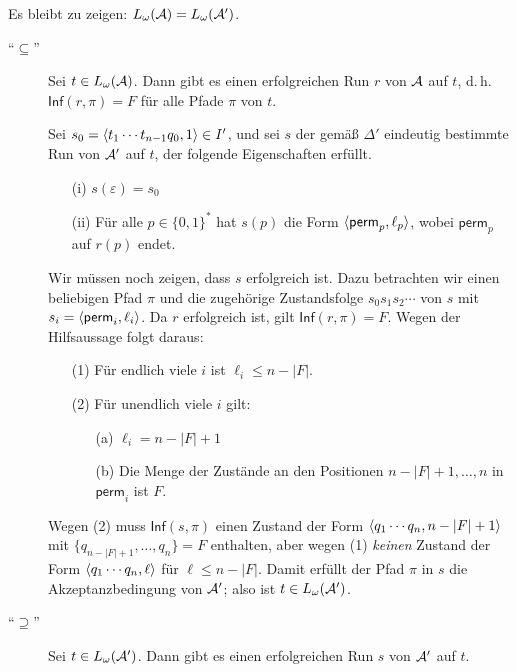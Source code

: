 \documentclass[fontsize=11pt, twoside=false, numbers=autoenddot]{scrbook}
\begin{document}
Es bleibt zu zeigen: $L_\omega(\mathcal{A}) = L_\omega(\mathcal{A}')$.
%
\begin{description}
  \item[{\boldmath"`$\subseteq$"'}]
    Sei $t \in L_\omega(\mathcal{A})$.
    Dann gibt es einen erfolgreichen Run $r$ von $\mathcal{A}$ auf $t$,
    d.\,h.\ $\textsf{Inf}(r,\pi) = F$ für alle Pfade $\pi$ von $t$.
    
    Sei $s_0 = \langle t_1\cdots t_{n-1}q_0,1\rangle \in I'$,
    und sei $s$ der gemäß $\Delta'$ eindeutig bestimmte Run von $\mathcal{A}'$ auf $t$,
    der folgende Eigenschaften erfüllt.
    \begin{enumerate}
      \item[(i)]
        $s(\varepsilon) = s_0$
      \item[(ii)]
        Für alle $p \in \{0,1\}^*$ hat $s(p)$ die Form $\langle \textsf{perm}_p,\ell_p\rangle$,
        wobei $\textsf{perm}_p$ auf $r(p)$ endet.
    \end{enumerate}
    Wir müssen noch zeigen, dass $s$ erfolgreich ist.
    Dazu betrachten wir einen beliebigen Pfad $\pi$
    und die zugehörige Zustandsfolge $s_0s_1s_2\cdots$ von $s$
    mit $s_i = \langle \textsf{perm}_i,\ell_i\rangle$.
    Da $r$ erfolgreich ist, gilt $\textsf{Inf}(r,\pi) = F$.
    Wegen der Hilfsaussage folgt daraus:
    \begin{enumerate}
      \item[(1)]
        Für endlich viele $i$ ist $\ell_i \leq n - |F|$.
      \item[(2)]
        Für unendlich viele $i$ gilt:
        \begin{enumerate}
          \item[(a)]
            $\ell_i = n - |F| + 1$
          \item[(b)]
            Die Menge der Zustände an den Positionen $n - |F| + 1,\dots,n$ in $\textsf{perm}_i$ ist $F$.
        \end{enumerate}
    \end{enumerate}
    Wegen (2) muss $\textsf{Inf}(s,\pi)$ einen Zustand der Form 
    $\langle q_1\cdots q_n, n-|F|+1\rangle$ mit $\{q_{n-|F|+1},\dots,q_n\} = F$ enthalten,
    aber wegen (1) \emph{keinen} Zustand der Form
    $\langle q_1\cdots q_n,\ell\rangle$ für $\ell \leq n-|F|$.
    Damit erfüllt der Pfad $\pi$ in $s$ die Akzeptanzbedingung von $\mathcal{A}'$;
    also ist $t \in L_\omega(\mathcal{A}')$.
    \par\medskip
  \item[{\boldmath"`$\supseteq$"'}]
    Sei $t \in L_\omega(\mathcal{A}')$.
    Dann gibt es einen erfolgreichen Run $s$ von $\mathcal{A}'$ auf $t$.

\end{description}
\end{document}
